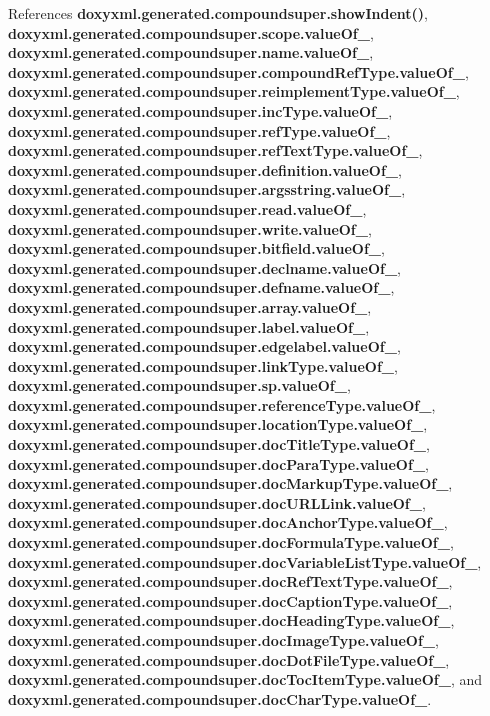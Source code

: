 References {\bf doxyxml.\+generated.\+compoundsuper.\+show\+Indent()}, {\bf doxyxml.\+generated.\+compoundsuper.\+scope.\+value\+Of\+\_\+}, {\bf doxyxml.\+generated.\+compoundsuper.\+name.\+value\+Of\+\_\+}, {\bf doxyxml.\+generated.\+compoundsuper.\+compound\+Ref\+Type.\+value\+Of\+\_\+}, {\bf doxyxml.\+generated.\+compoundsuper.\+reimplement\+Type.\+value\+Of\+\_\+}, {\bf doxyxml.\+generated.\+compoundsuper.\+inc\+Type.\+value\+Of\+\_\+}, {\bf doxyxml.\+generated.\+compoundsuper.\+ref\+Type.\+value\+Of\+\_\+}, {\bf doxyxml.\+generated.\+compoundsuper.\+ref\+Text\+Type.\+value\+Of\+\_\+}, {\bf doxyxml.\+generated.\+compoundsuper.\+definition.\+value\+Of\+\_\+}, {\bf doxyxml.\+generated.\+compoundsuper.\+argsstring.\+value\+Of\+\_\+}, {\bf doxyxml.\+generated.\+compoundsuper.\+read.\+value\+Of\+\_\+}, {\bf doxyxml.\+generated.\+compoundsuper.\+write.\+value\+Of\+\_\+}, {\bf doxyxml.\+generated.\+compoundsuper.\+bitfield.\+value\+Of\+\_\+}, {\bf doxyxml.\+generated.\+compoundsuper.\+declname.\+value\+Of\+\_\+}, {\bf doxyxml.\+generated.\+compoundsuper.\+defname.\+value\+Of\+\_\+}, {\bf doxyxml.\+generated.\+compoundsuper.\+array.\+value\+Of\+\_\+}, {\bf doxyxml.\+generated.\+compoundsuper.\+label.\+value\+Of\+\_\+}, {\bf doxyxml.\+generated.\+compoundsuper.\+edgelabel.\+value\+Of\+\_\+}, {\bf doxyxml.\+generated.\+compoundsuper.\+link\+Type.\+value\+Of\+\_\+}, {\bf doxyxml.\+generated.\+compoundsuper.\+sp.\+value\+Of\+\_\+}, {\bf doxyxml.\+generated.\+compoundsuper.\+reference\+Type.\+value\+Of\+\_\+}, {\bf doxyxml.\+generated.\+compoundsuper.\+location\+Type.\+value\+Of\+\_\+}, {\bf doxyxml.\+generated.\+compoundsuper.\+doc\+Title\+Type.\+value\+Of\+\_\+}, {\bf doxyxml.\+generated.\+compoundsuper.\+doc\+Para\+Type.\+value\+Of\+\_\+}, {\bf doxyxml.\+generated.\+compoundsuper.\+doc\+Markup\+Type.\+value\+Of\+\_\+}, {\bf doxyxml.\+generated.\+compoundsuper.\+doc\+U\+R\+L\+Link.\+value\+Of\+\_\+}, {\bf doxyxml.\+generated.\+compoundsuper.\+doc\+Anchor\+Type.\+value\+Of\+\_\+}, {\bf doxyxml.\+generated.\+compoundsuper.\+doc\+Formula\+Type.\+value\+Of\+\_\+}, {\bf doxyxml.\+generated.\+compoundsuper.\+doc\+Variable\+List\+Type.\+value\+Of\+\_\+}, {\bf doxyxml.\+generated.\+compoundsuper.\+doc\+Ref\+Text\+Type.\+value\+Of\+\_\+}, {\bf doxyxml.\+generated.\+compoundsuper.\+doc\+Caption\+Type.\+value\+Of\+\_\+}, {\bf doxyxml.\+generated.\+compoundsuper.\+doc\+Heading\+Type.\+value\+Of\+\_\+}, {\bf doxyxml.\+generated.\+compoundsuper.\+doc\+Image\+Type.\+value\+Of\+\_\+}, {\bf doxyxml.\+generated.\+compoundsuper.\+doc\+Dot\+File\+Type.\+value\+Of\+\_\+}, {\bf doxyxml.\+generated.\+compoundsuper.\+doc\+Toc\+Item\+Type.\+value\+Of\+\_\+}, and {\bf doxyxml.\+generated.\+compoundsuper.\+doc\+Char\+Type.\+value\+Of\+\_\+}.



